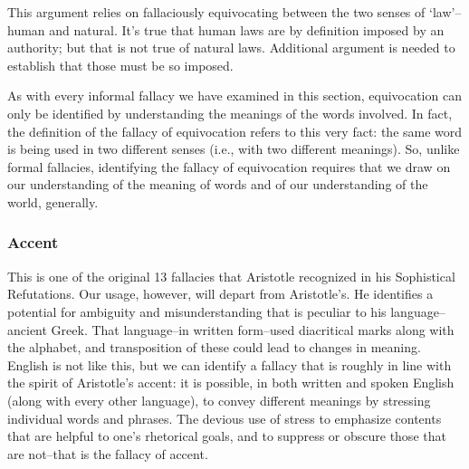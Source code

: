 This argument relies on fallaciously equivocating between the two senses of `law'--human and
natural. It's true that human laws are by definition imposed by an authority; but that is not true of
natural laws. Additional argument is needed to establish that those must be so imposed.

As with every informal fallacy we have examined in this section, equivocation
can only be identified by understanding the meanings of the words involved. In
fact, the definition of the fallacy of equivocation refers to this very fact: the same
word is being used in two different senses (i.e., with two different meanings). So,
unlike formal fallacies, identifying the fallacy of equivocation requires that we
draw on our understanding of the meaning of words and of our understanding
of the world, generally.




\subsubsection{Accent}

This is one of the original 13 fallacies that Aristotle recognized in his Sophistical Refutations. Our
usage, however, will depart from Aristotle's. He identifies a potential for ambiguity and
misunderstanding that is peculiar to his language--ancient Greek. That language--in written
form--used diacritical marks along with the alphabet, and transposition of these could lead to
changes in meaning. English is not like this, but we can identify a fallacy that is roughly in line
with the spirit of Aristotle's accent: it is possible, in both written and spoken English (along with
every other language), to convey different meanings by stressing individual words and phrases.
The devious use of stress to emphasize contents that are helpful to one's rhetorical goals, and to
suppress or obscure those that are not--that is the fallacy of accent.

